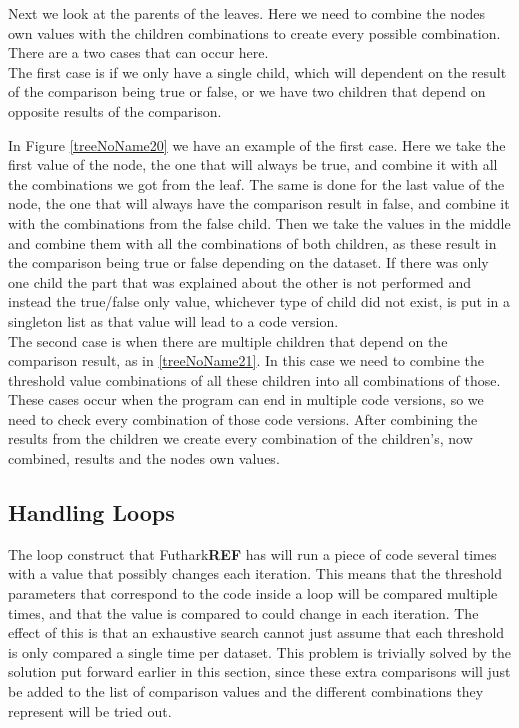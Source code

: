 Next we look at the parents of the leaves. Here we need to combine the nodes
own values with the children combinations to create every possible
combination. There are a two cases that can occur here. \\
The first case is if we only have a single child, which will dependent on the result of
the comparison being true or false, or we have two children that depend on
opposite results of the comparison. 

In Figure \ref{treeNoName20} we have an example of the first case. Here we take the first
value of the node, the one that will always be true, and combine it with all
the combinations we got from the leaf. The same is done for the last value of
the node, the one that will always have the comparison result in false, and combine it with
the combinations from the false child. Then we take the values in the middle
and combine them with all the combinations of both children, as these result in
the comparison being true or false depending on the dataset. If there was only
one child the part that was explained about the other is not performed and
instead the true/false only value, whichever type of child did not exist, is
put in a singleton list as that value will lead to a code version.\\
The second case is when 
there are multiple children that depend on the comparison result, as in
\ref{treeNoName21}. In this case we need to combine the threshold value
combinations of all these children into all combinations of those. These cases
occur when the program can end in multiple code versions, so we need to check
every combination of those code versions. After combining the results from the
children we create every combination of the children's, now combined, results
and the nodes own values. 


\subsection{Handling Loops}
The loop construct that Futhark\textbf{REF} has will run a piece of code several times with
a value that possibly changes each iteration. This means that the threshold
parameters that correspond to the code inside a loop will be compared multiple
times, and that the value is compared to could change in each iteration. The
effect of this is that an exhaustive search cannot just assume that each
threshold is only compared a single time per dataset. This problem is
trivially solved by the solution put forward earlier in this section, since
these extra comparisons will just be added to the list of comparison values and
the different combinations they represent will be tried out.

